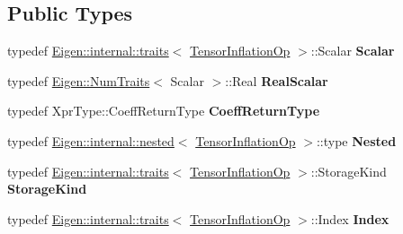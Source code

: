 \subsection*{Public Types}
\begin{DoxyCompactItemize}
\item 
\mbox{\label{class_eigen_1_1_tensor_inflation_op_a236d797b18abd1a3b63f20f2d421342e}} 
typedef \hyperlink{struct_eigen_1_1internal_1_1traits}{Eigen\+::internal\+::traits}$<$ \hyperlink{class_eigen_1_1_tensor_inflation_op}{Tensor\+Inflation\+Op} $>$\+::Scalar {\bfseries Scalar}
\item 
\mbox{\label{class_eigen_1_1_tensor_inflation_op_a328f34b1ae6629d1ceff82b08b538144}} 
typedef \hyperlink{group___core___module_struct_eigen_1_1_num_traits}{Eigen\+::\+Num\+Traits}$<$ Scalar $>$\+::Real {\bfseries Real\+Scalar}
\item 
\mbox{\label{class_eigen_1_1_tensor_inflation_op_a434347894bf1e84b4932cf62b205c185}} 
typedef Xpr\+Type\+::\+Coeff\+Return\+Type {\bfseries Coeff\+Return\+Type}
\item 
\mbox{\label{class_eigen_1_1_tensor_inflation_op_a8d5118ec09afae8fd420cbebd370b281}} 
typedef \hyperlink{struct_eigen_1_1internal_1_1nested}{Eigen\+::internal\+::nested}$<$ \hyperlink{class_eigen_1_1_tensor_inflation_op}{Tensor\+Inflation\+Op} $>$\+::type {\bfseries Nested}
\item 
\mbox{\label{class_eigen_1_1_tensor_inflation_op_ae9a66f9458b7bb430952017d88c46bba}} 
typedef \hyperlink{struct_eigen_1_1internal_1_1traits}{Eigen\+::internal\+::traits}$<$ \hyperlink{class_eigen_1_1_tensor_inflation_op}{Tensor\+Inflation\+Op} $>$\+::Storage\+Kind {\bfseries Storage\+Kind}
\item 
\mbox{\label{class_eigen_1_1_tensor_inflation_op_afe1a7224db27007325cbee73f0287d2a}} 
typedef \hyperlink{struct_eigen_1_1internal_1_1traits}{Eigen\+::internal\+::traits}$<$ \hyperlink{class_eigen_1_1_tensor_inflation_op}{Tensor\+Inflation\+Op} $>$\+::Index {\bfseries Index}
\item 
\mbox{\label{class_eigen_1_1_tensor_inflation_op_a236d797b18abd1a3b63f20f2d421342e}} 

\end{DoxyCompactItemize}
